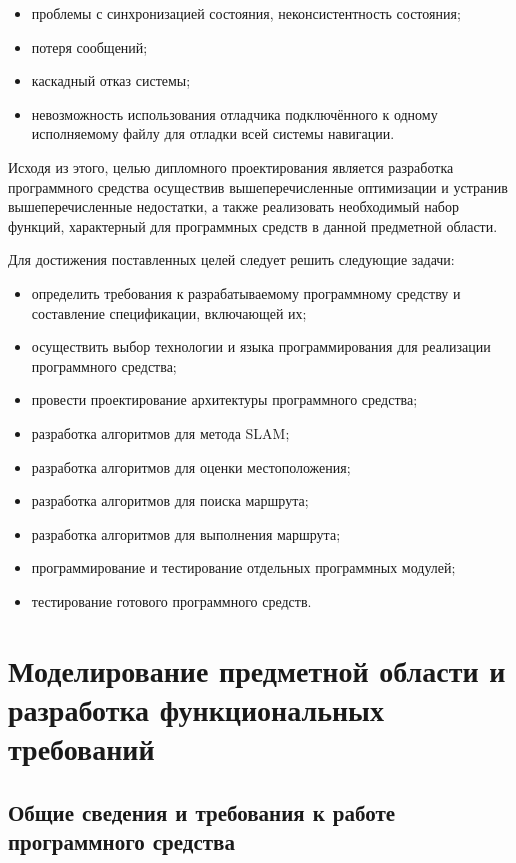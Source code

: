 \begin{itemize}
	\item проблемы с синхронизацией состояния, неконсистентность состояния;
	\item потеря сообщений;
	\item каскадный отказ системы;
	\item невозможность использования отладчика подключённого к одному
		исполняемому файлу для отладки всей системы навигации.
\end{itemize}

Исходя из этого, целью дипломного проектирования является разработка
программного средства осуществив вышеперечисленные оптимизации и устранив
вышеперечисленные недостатки, а также
реализовать необходимый набор функций, характерный для программных средств в
данной предметной области.

Для достижения поставленных целей следует решить следующие задачи: 
\begin{itemize}
	\item определить требования  к  разрабатываемому  программному  средству  и 
	составление спецификации, включающей их; 
	\item осуществить выбор  технологии  и  языка  программирования  для
		реализации программного средства; 
	\item провести проектирование архитектуры программного средства; 
	\item разработка алгоритмов для метода SLAM; 
	\item разработка алгоритмов для оценки местоположения; 
	\item разработка алгоритмов для поиска маршрута; 
	\item разработка алгоритмов для выполнения маршрута; 
	\item программирование и тестирование отдельных программных модулей; 
	\item тестирование готового программного средств.
\end{itemize}

	\section{Моделирование предметной области и разработка функциональных
	требований}

	\subsection{Общие сведения и требования к работе программного средства}

